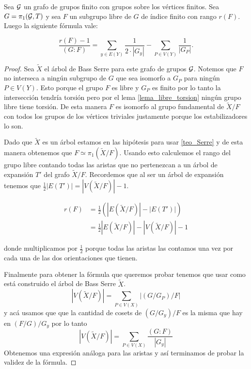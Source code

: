 \documentclass[tesis.tex]{subfiles}
\newcommand{\cG}{ {\cal G} }
\newcommand{\Xm}{\widetilde X}
\begin{document}
\begin{prop}\cite{karrass1973finite}\label{prop_karrass_formula}
	Sea $\cal G$ un grafo de grupos finito con grupos sobre los vértices finitos.
	Sea $G = \pi_1 ({\cal G}, T)$ y sea $F$ un subgrupo libre de $G$ de índice finito con rango $r(F)$.
	Luego la siguiente fórmula vale:
	
	\begin{equation*}
		\frac{r(F) - 1}{(G:F)} = \sum_{y \in E(Y)} \frac{1}{2 \cdot |G_y|} - \sum_{P \in V(Y)} \frac{1}{|G_P|}.
	\end{equation*}
\end{prop}
\begin{proof}
	Sea $\tilde X$ el árbol de Bass Serre para este grafo de grupos $\cG$.
	Notemos que $F$ no interseca a ningún subgrupo de $G$ que sea isomorfo a $G_P$ para ningún $P \in V(Y)$. 
	Esto porque el grupo $F$ es libre y $G_P$ es finito por lo tanto la intersección tendría torsión pero por el lema \ref{lema_libre_torsion} ningún grupo libre tiene torsión.
	De esta manera $F$ es isomorfo al grupo fundamental de $\Xm / F$ con todos los grupos de los vértices triviales justamente porque los estabilizadores lo son.
	
	Dado que $\tilde X$ es un árbol estamos en las hipótesis para usar \ref{teo_Serre} y de esta manera obtenemos que $F \simeq \pi_1 (\widetilde X / F)$.
	Usando esto calculemos el rango del grupo libre contando todas las aristas que no pertenezcan a un árbol de expansión $T'$ del grafo $\Xm / F$.
	Recordemos que al ser un árbol de expansión tenemos que $\tfrac{1}{2}|E(T')| = |V(\Xm / F)| - 1$. 
	
	\begin{align*}
		r(F) &= \frac{1}{2} (|E(\Xm / F)| - |E(T')|) \\
		&= \frac{1}{2} |E(\Xm / F)| - |V(\Xm / F) | - 1
	\end{align*}

	donde multiplicamos por $\tfrac{1}{2}$ porque todas las aristas las contamos una vez por cada una de las dos orientaciones que tienen.
	
	Finalmente para obtener la fórmula que queremos probar tenemos que usar como está construido el árbol de Bass Serre $\Xm$.
	\begin{equation*}
		|V(\Xm / F)| = \sum_{P \in V(X)} |(G/G_P)/F|
	\end{equation*}
	y acá usamos que que la cantidad de cosets de $(G/G_y)/F$ es la misma que hay en $(F / G)/G_y$
	por lo tanto 
	\begin{equation*}
		|V(\Xm / F)| = \sum_{P \in V(X)} \dfrac{(G:F)}{|G_y|}
	\end{equation*}
	Obtenemos una expresión análoga para las aristas y así terminamos de probar la validez de la fórmula.
\end{proof}
\end{document}
